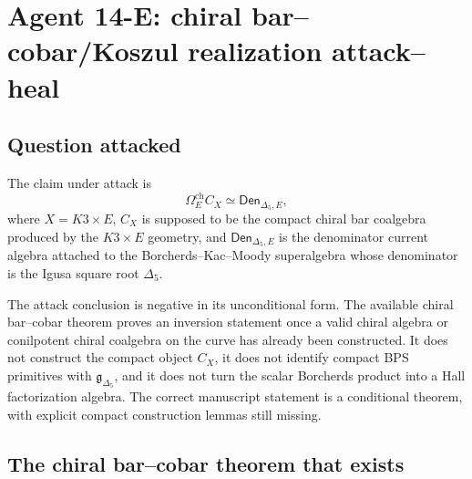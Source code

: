 \section{Agent 14-E: chiral bar--cobar/Koszul realization attack--heal}
\label{sec:agent14-chiral-bar-cobar-koszul-realization}

\providecommand{\C}{\mathbb C}
\providecommand{\Z}{\mathbb Z}
\providecommand{\Ran}{\operatorname{Ran}}
\providecommand{\Fact}{\mathsf{Fact}}
\providecommand{\Coalg}{\mathsf{Coalg}}
\providecommand{\ChAlg}{\mathsf{ChAlg}}
\providecommand{\Cur}{\operatorname{Cur}}
\providecommand{\Prim}{\operatorname{Prim}}
\providecommand{\sdim}{\operatorname{sdim}}
\providecommand{\Den}{\mathsf{Den}}
\providecommand{\Aut}{\operatorname{Aut}}
\providecommand{\Bch}{B^{\mathrm{ch}}}
\providecommand{\Och}{\Omega^{\mathrm{ch}}}
\providecommand{\Spch}{\mathrm{Sp}^{\mathrm{ch}}}
\providecommand{\Aden}{\mathcal A_{\mathrm{den}}}
\providecommand{\gDelta}{\mathfrak g_{\Delta_5}}
\providecommand{\DDelta}{\Den_{\Delta_5,E}}
\providecommand{\Hall}{\mathcal H}

\subsection{Question attacked}

The claim under attack is
\[
        \Och_E C_X \simeq \DDelta ,
\]
where \(X=K3\times E\), \(C_X\) is supposed to be the compact chiral
bar coalgebra produced by the \(K3\times E\) geometry, and
\(\DDelta\) is the denominator current algebra attached to the
Borcherds--Kac--Moody superalgebra whose denominator is the Igusa square
root \(\Delta_5\).

The attack conclusion is negative in its unconditional form.  The
available chiral bar--cobar theorem proves an inversion statement once a
valid chiral algebra or conilpotent chiral coalgebra on the curve has
already been constructed.  It does not construct the compact object
\(C_X\), it does not identify compact BPS primitives with
\(\gDelta\), and it does not turn the scalar Borcherds product into a
Hall factorization algebra.  The correct manuscript statement is a
conditional theorem, with explicit compact construction lemmas still
missing.

\subsection{The chiral bar--cobar theorem that exists}

